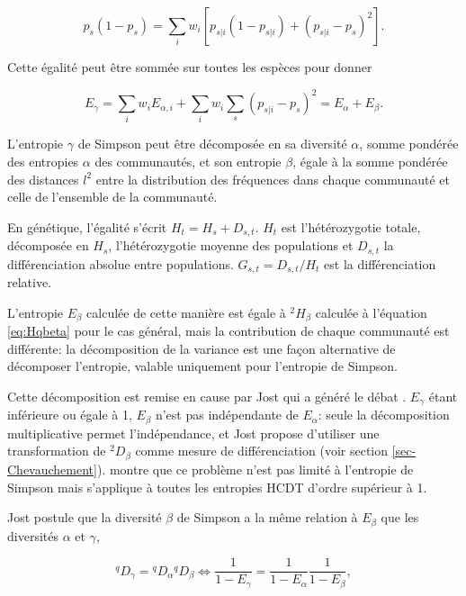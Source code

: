 \documentclass[
  11pt,
  french,
  a4paper,
  extrafontsizes,onecolumn,openright
  ]{memoir}
\begin{document}
\begin{equation}
  \label{eq:DecSimpsons}
  p_s\left(1-p_s\right)=\sum_i{w_i\left[p_{s|i}\left(1-p_{s|i}\right)+{\left(p_{s|i}-p_s\right)}^2\right]}.
\end{equation}

Cette égalité peut être sommée sur toutes les espèces pour donner

\begin{equation}
  \label{eq:SimpsonNei}
  E_{\gamma}=\sum_i{w_i E_{\alpha,i}}+\sum_i{w_i\sum_s{{\left(p_{s|i}-p_s\right)}^2}}=E_{\alpha}+E_{\beta}.
\end{equation}

L'entropie \(\gamma\) de Simpson peut être décomposée en sa diversité \(\alpha\), somme pondérée des entropies \(\alpha\) des communautés, et son entropie \(\beta\), égale à la somme pondérée des distances \(l^2\) entre la distribution des fréquences dans chaque communauté et celle de l'ensemble de la communauté.

En génétique, l'égalité s'écrit\autocite{Nei1973} \(H_t=H_s+D_{s,t}\).
\(H_t\) est l'hétérozygotie totale, décomposée en \(H_s\), l'hétérozygotie moyenne des populations et \(D_{s,t}\) la différenciation absolue entre populations.
\(G_{s,t}={D_{s,t}}/{H_t}\) est la différenciation relative.

L'entropie \(E_{\beta}\) calculée de cette manière est égale à \(^{2}\!H_{\beta}\) calculée à l'équation \eqref{eq:Hqbeta} pour le cas général, mais la contribution de chaque communauté est différente: la décomposition de la variance est une façon alternative de décomposer l'entropie, valable uniquement pour l'entropie de Simpson.

Cette décomposition est remise en cause par Jost \autocite{Jost2007,Jost2008} qui a généré le débat \autocite{Heller2009,Ryman2009,Jost2009a,Whitlock2011}.
\(E_{\gamma}\) étant inférieure ou égale à 1, \(E_{\beta}\) n'est pas indépendante de \(E_{\alpha}\): seule la décomposition multiplicative permet l'indépendance, et Jost propose d'utiliser une transformation de \(^{2}\!D_{\beta}\) comme mesure de différenciation (voir section \ref{sec-Chevauchement}). \textcite{Gregorius2014} montre que ce problème n'est pas limité à l'entropie de Simpson mais s'applique à toutes les entropies HCDT d'ordre supérieur à 1.

Jost postule que la diversité \(\beta\) de Simpson a la même relation à \(E_{\beta}\) que les diversités \(\alpha\) et \(\gamma\),

\begin{equation}
  \label{eq:Dqgamma}
  ^{q}\!D_{\gamma} = {^{q}\!D_{\alpha}}{^{q}\!D_{\beta}} \Leftrightarrow \frac{1}{1-E_{\gamma}}=\frac{1}{1-E_{\alpha}}\frac{1}{1-E_{\beta}},
\end{equation}
\end{document}
